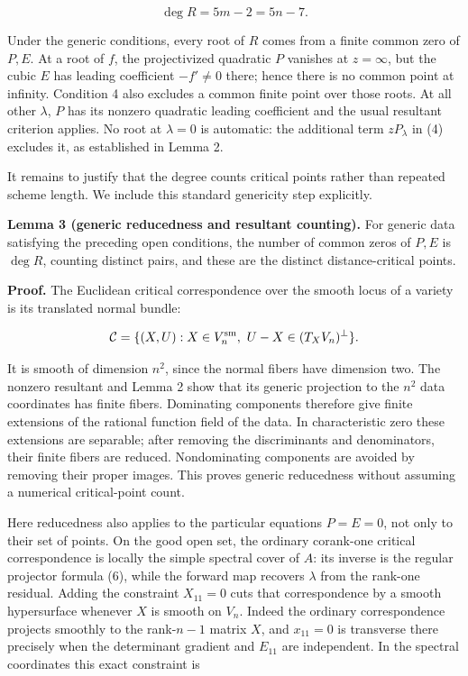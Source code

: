 \documentclass[10pt,a4paper]{article}
\begin{document}
\nopagebreak[4]

\[\deg R=5m-2=5n-7.\tag{11}\]

Under the generic conditions, every root of \(R\) comes from a finite
common zero of \(P,E\). At a root of \(f\), the projectivized quadratic
\(P\) vanishes at \(z=\infty\), but the cubic \(E\) has leading
coefficient \(-f'\ne0\) there; hence there is no common point at
infinity. Condition 4 also excludes a common finite point over those
roots. At all other \(\lambda\), \(P\) has its nonzero quadratic leading
coefficient and the usual resultant criterion applies. No root at
\(\lambda=0\) is automatic: the additional term \(zP_\lambda\) in (4)
excludes it, as established in Lemma 2.

It remains to justify that the degree counts critical points rather than
repeated scheme length. We include this standard genericity step
explicitly.


\textbf{Lemma 3 (generic reducedness and resultant counting).} For
generic data satisfying the preceding open conditions, the number of
common zeros of \(P,E\) is \(\deg R\), counting distinct pairs, and
these are the distinct distance-critical points.

\textbf{Proof.} The Euclidean critical correspondence over the smooth
locus of a variety is its translated normal bundle:

\nopagebreak[4]

\[\mathcal C=\{(X,U):X\in V_n^{\rm sm},\ U-X\in (T_XV_n)^\perp\}.\]

It is smooth of dimension \(n^2\), since the normal fibers have
dimension two. The nonzero resultant and Lemma 2 show that its generic
projection to the \(n^2\) data coordinates has finite fibers. Dominating
components therefore give finite extensions of the rational function
field of the data. In characteristic zero these extensions are
separable; after removing the discriminants and denominators, their
finite fibers are reduced. Nondominating components are avoided by
removing their proper images. This proves generic reducedness without
assuming a numerical critical-point count.

Here reducedness also applies to the particular equations \(P=E=0\), not
only to their set of points. On the good open set, the ordinary
corank-one critical correspondence is locally the simple spectral cover
of \(A\): its inverse is the regular projector formula (6), while the
forward map recovers \(\lambda\) from the rank-one residual. Adding the
constraint \(X_{11}=0\) cuts that correspondence by a smooth
hypersurface whenever \(X\) is smooth on \(V_n\). Indeed the ordinary
correspondence projects smoothly to the rank-\(n-1\) matrix \(X\), and
\(x_{11}=0\) is transverse there precisely when the determinant gradient
and \(E_{11}\) are independent. In the spectral coordinates this exact
constraint is
\end{document}
